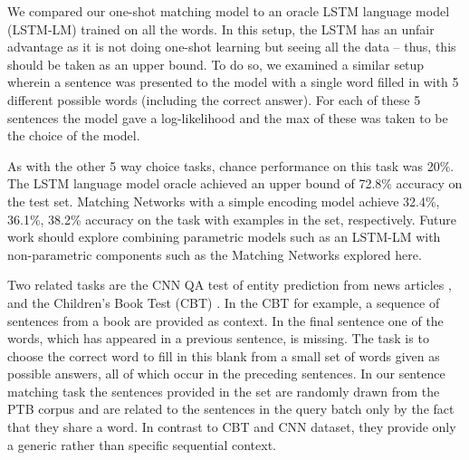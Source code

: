 We compared our one-shot matching model to an oracle LSTM language model (LSTM-LM) \cite{zaremba2014recurrent} trained on all the words. In this setup, the LSTM has an unfair advantage as it is not doing one-shot learning but seeing all the data -- thus, this should be taken as an upper bound.  To do so, we examined a similar setup wherein a sentence was presented to the model with a single word filled in with 5 different possible words (including the correct answer).  For each of these 5 sentences the model gave a log-likelihood and the max of these was taken to be the choice of the model.

As with the other 5 way choice tasks, chance performance on this task was 20\%.  The LSTM language model oracle achieved an upper bound of 72.8\% accuracy on the test set.  Matching Networks with a simple encoding model achieve 32.4\%, 36.1\%, 38.2\% accuracy on the task with  examples in the set, respectively.  Future work should explore combining parametric models such as an LSTM-LM with non-parametric components such as the Matching Networks explored here.

Two related tasks are the CNN QA test of entity prediction from news articles \cite{hermann2015teaching}, and the Children's Book Test (CBT) \cite{hill2015goldilocks}.  In the CBT for example, a sequence of sentences from a book are provided as context.  In the final sentence one of the words, which has appeared in a previous sentence, is missing. The task is to choose the correct word to fill in this blank from a small set of words given as possible answers, all of which occur in the preceding sentences.  In our sentence matching task the sentences provided in the set are randomly drawn from the PTB corpus and are related to the sentences in the query batch only by the fact that they share a word. In contrast to CBT and CNN dataset, they provide only a generic rather than specific sequential context.